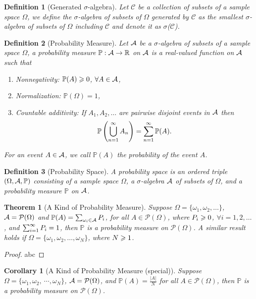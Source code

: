 \documentclass[openany,12pt]{book}
\newtheorem{theorem}{Theorem}[chapter]
\newtheorem{corollary}{Corollary}[chapter]
\newtheorem{definition}{Definition}[chapter]
\begin{document}
\begin{definition}[Generated $\sigma$-algebra]
  Let $\mathcal{C}$ be a collection of subsets of a sample space $\Omega$, we define the $\sigma$-algebra of subsets of $\Omega$ generated by $\mathcal{C}$ as the smallest $\sigma$-algebra of subsets of $\Omega$ including $\mathcal{C}$ and denote it as $\sigma$($\mathcal{C}$).
\end{definition}

\begin{definition}[Probability Measure]
  Let $\mathcal{A}$ be a $\sigma$-algebra of subsets of a sample space $\Omega$, a probability measure $\mathbb{P}:\mathcal{A}\to\mathbb{R}$ on $\mathcal{A}$ is a real-valued function on $\mathcal{A}$ such that
  \begin{enumerate}
    \item Nonnegativity: $\mathbb{P}(A)\geqslant0$, $\forall A\in\mathcal{A}$,
    \item Normalization: $\mathbb{P}(\Omega)=1$,
    \item Countable additivity: If $A_1,A_2,\dots$ are pairwise disjoint events in $\mathcal{A}$ then $$\mathbb{P}\left(\bigcup_{n=1}^\infty A_n \right)=\sum_{n=1}^{\infty} \mathbb{P}(A).$$
  \end{enumerate}
  For an event $A\in\mathcal{A}$, we call $\mathbb{P}(A)$ the probability of the event $A$.
\end{definition}

\begin{definition}[Probability Space]
  A probability space is an ordered triple $(\Omega,\mathcal{A},\mathbb{P})$ consisting of a sample space $\Omega$, a $\sigma$-algebra $\mathcal{A}$  of subsets of $\Omega$, and a probability measure $\mathbb{P}$ on $\mathcal{A}$.
\end{definition}

\begin{theorem}[A Kind of Probability Measure]
  Suppose $\Omega=\{\omega_1,\omega_2,\dots\}$, $\mathcal{A}=\mathcal{P}(\Omega)$ and $\mathbb{P}(A)=\sum_{\omega_i\in\mathcal{A}}P_i$, for all $A\in\mathcal{P}(\Omega)$, where $P_i\geqslant0$, $\forall i=1,2,\dots$, and $\sum_{i=1}^{\infty} P_i =1$, then $\mathbb{P}$ is a probability measure on $\mathcal{P}(\Omega)$. A similar result holds if $\Omega=\{\omega_1,\omega_2,\dots,\omega_N\}$, where $N\geqslant1$.
\end{theorem}

\begin{proof}
  abc
\end{proof}

\begin{corollary}[A Kind of Probability Measure (special)]
  Suppose $\Omega=\{\omega_1,\omega_2,\ \cdots,\omega_N\}$, $\mathcal{A}=\mathcal{P}(\Omega)$, and $\mathbb{P}(A)=\frac{|A|}{N}$ for all $A\in\mathcal{P}(\Omega)$, then $\mathbb{P}$ is a probability measure on $\mathcal{P}(\Omega)$.
\end{corollary}
\end{document}

